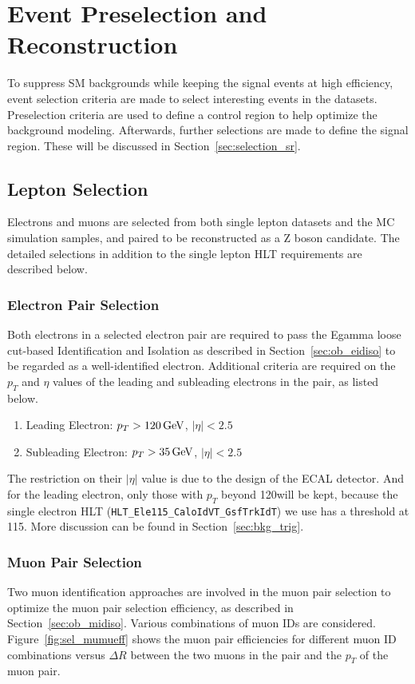 \section{Event Preselection and Reconstruction}
To suppress SM backgrounds while keeping the signal events at high efficiency, event selection criteria are made to select interesting events in the datasets. Preselection criteria are used to define a control region to help optimize the background modeling. Afterwards, further selections are made to define the signal region. These will be discussed in Section~\ref{sec:selection_sr}.

\subsection{Lepton Selection}
Electrons and muons are selected from both single lepton datasets and the MC simulation samples, and paired to be reconstructed as a Z boson candidate. The detailed selections in addition to the single lepton HLT requirements are described below.
\subsubsection{Electron Pair Selection}
Both electrons in a selected electron pair are required to pass the Egamma loose cut-based Identification and Isolation as described in Section~\ref{sec:ob_eidiso} to be regarded as a well-identified electron. Additional criteria are required on the $p_T$ and $\eta$ values of the leading and subleading electrons in the pair, as listed below.
\begin{enumerate}
\item Leading Electron: $p_T >120\,\text{Ge\hspace{-.08em}V}$, $|\eta|<2.5$
\item Subleading Electron: $p_T >35\,\text{Ge\hspace{-.08em}V}$, $|\eta|<2.5$
\end{enumerate}

The restriction on their $|\eta|$ value is due to the design of the ECAL detector. And for the leading electron, only those with $p_T$ beyond 120\GeV will be kept, because the single electron HLT (\texttt{HLT\_Ele115\_CaloIdVT\_GsfTrkIdT}) we use has a threshold at 115\GeV. More discussion can be found in Section~\ref{sec:bkg_trig}.

\subsubsection{Muon Pair Selection}\label{sec:muonselection}
Two muon identification approaches are involved in the muon pair selection to optimize the muon pair selection efficiency, as described in Section~\ref{sec:ob_midiso}. Various combinations of muon IDs are considered. Figure~\ref{fig:sel_mumueff} shows the muon pair efficiencies for different muon ID combinations versus $\Delta R$ between the two muons in the pair and the $p_T$ of the muon pair.

